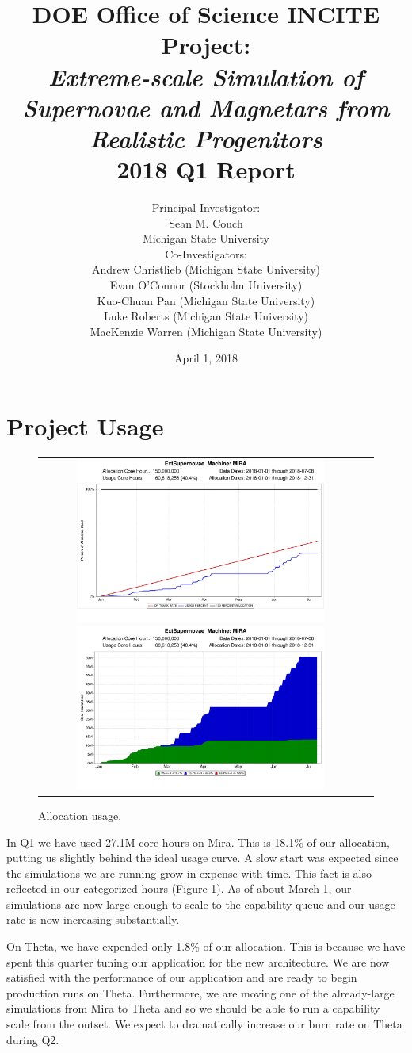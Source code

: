 \documentclass[12pt,titlepage]{article}
\title{DOE Office of Science INCITE Project:\\
{\it Extreme-scale Simulation of Supernovae and Magnetars from Realistic Progenitors}\\
2018 Q1 Report}
\author{Principal Investigator:\\Sean M. Couch\\
  Michigan State University \vspace{0.1in}\\
  Co-Investigators: \\
  Andrew Christlieb (Michigan State University) \\
  Evan O'Connor (Stockholm University)\\
  Kuo-Chuan Pan (Michigan State University) \\
  Luke Roberts (Michigan State University) \\
  MacKenzie Warren (Michigan State University) \\
}
\date{April 1, 2018}
\begin{document}
\maketitle


\section{Project Usage}



\begin{figure}
  \begin{tabular}{cc}
    \includegraphics[width=3.25in]{on_track_graph.png}
    \includegraphics[width=3.25in]{categorized_hours_graph.png}
  \end{tabular}
  \caption{Allocation usage.}
  \label{fig:usage}
\end{figure}

In Q1 we have used 27.1M core-hours on Mira.
This is 18.1\% of our allocation, putting us slightly behind the ideal usage curve.
A slow start was expected since the simulations we are running grow in expense with time.
This fact is also reflected in our categorized hours (Figure \ref{fig:usage}).
As of about March 1, our simulations are now large enough to scale to the capability queue and our usage rate is now increasing substantially.

On Theta, we have expended only 1.8\% of our allocation.
This is because we have spent this quarter tuning our application for the new architecture.
We are now satisfied with the performance of our application and are ready to begin production runs on Theta.
Furthermore, we are moving one of the already-large simulations from Mira to Theta and so we should be able to run a capability scale from the outset.
We expect to dramatically increase our burn rate on Theta during Q2.
\end{document}

